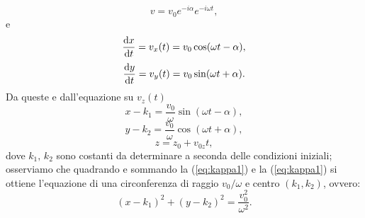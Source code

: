\begin{esempio}
$$
v = v_0 e^{-i\alpha}e^{-i\omega t},
$$
e
$$
\frac{\mathrm{d} x}{\mathrm{d} t} = v_x(t) = v_0 \cos(\omega t - \alpha),
$$
$$
\frac{\mathrm{d} y}{\mathrm{d} t} = v_y(t) = v_0 \sin(\omega t + \alpha).
$$
Da queste e dall'equazione su $v_z(t)$
\begin{equation}
  x - k_1 = \frac{v_0}{\omega} \sin(\omega t - \alpha),
  \label{eq:kappa1}
\end{equation}
\begin{equation}
  y - k_2 = \frac{v_0}{\omega} \cos(\omega t + \alpha),
  \label{eq:kappa2}
\end{equation}
$$
z = z_0 + v_{0z}t,
$$
dove $k_1,\,k_2$ sono costanti da determinare a seconda delle
condizioni iniziali; osserviamo che quadrando e sommando la
(\ref{eq:kappa1}) e la (\ref{eq:kappa1}) si ottiene l'equazione di una
circonferenza di raggio $v_0/\omega$ e centro $(k_1,k_2)$, ovvero:
$$
(x - k_1)^2 + (y - k_2)^2 = \frac{v_0^2}{\omega^2}.
$$
\end{esempio}

